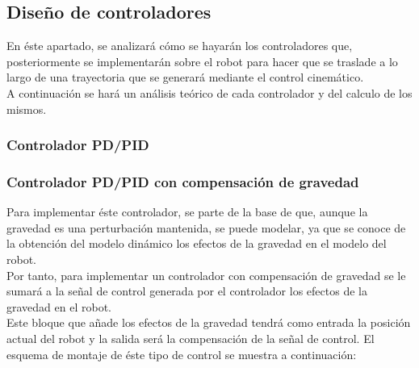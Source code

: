 	\subsection{Diseño de controladores}
	En éste apartado, se analizará cómo se hayarán los controladores que, posteriormente se implementarán sobre el robot para hacer que se traslade a lo largo de una trayectoria que se generará mediante el control cinemático.\\
	A continuación se hará un análisis teórico de cada controlador y del calculo de los mismos.
	\subsubsection{Controlador PD/PID}
	\subsubsection{Controlador PD/PID con compensación de gravedad}
	Para implementar éste controlador, se parte de la base de que, aunque la gravedad es una perturbación mantenida, se puede
modelar, ya que se conoce de la obtención del modelo dinámico los efectos de la gravedad en el modelo del robot.\\
Por tanto, para implementar un controlador con compensación de gravedad se le sumará a la señal de control generada por el
controlador los efectos de la gravedad en el robot.\\
Este bloque que añade los efectos de la gravedad tendrá como entrada la posición actual del robot y la salida será la compensación de la señal de control. El esquema de montaje de éste tipo de control se muestra a continuación:
